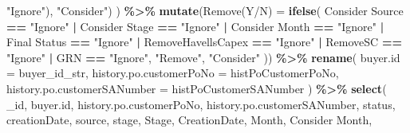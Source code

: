 \documentclass[
]{article}
\newenvironment{Shaded}{\begin{snugshade}}{\end{snugshade}}
\newcommand{\AttributeTok}[1]{\textcolor[rgb]{0.13,0.29,0.53}{#1}}
\newcommand{\FunctionTok}[1]{\textcolor[rgb]{0.13,0.29,0.53}{\textbf{#1}}}
\newcommand{\NormalTok}[1]{#1}
\newcommand{\OtherTok}[1]{\textcolor[rgb]{0.56,0.35,0.01}{#1}}
\newcommand{\SpecialCharTok}[1]{\textcolor[rgb]{0.81,0.36,0.00}{\textbf{#1}}}
\newcommand{\StringTok}[1]{\textcolor[rgb]{0.31,0.60,0.02}{#1}}
\begin{document}
\begin{Shaded}
\begin{Highlighting}[]
                                             \StringTok{"Ignore"}\NormalTok{),}
                                      \StringTok{"Consider"}\NormalTok{)}
\NormalTok{        ) }\SpecialCharTok{\%\textgreater{}\%}
          \FunctionTok{mutate}\NormalTok{(}\StringTok{\textasciigrave{}}\AttributeTok{Remove(Y/N)}\StringTok{\textasciigrave{}} \OtherTok{=} \FunctionTok{ifelse}\NormalTok{(}
            \StringTok{\textasciigrave{}}\AttributeTok{Consider Source}\StringTok{\textasciigrave{}} \SpecialCharTok{==} \StringTok{"Ignore"} \SpecialCharTok{|} \StringTok{\textasciigrave{}}\AttributeTok{Consider Stage}\StringTok{\textasciigrave{}} \SpecialCharTok{==} \StringTok{"Ignore"} \SpecialCharTok{|}
              \StringTok{\textasciigrave{}}\AttributeTok{Consider Month}\StringTok{\textasciigrave{}} \SpecialCharTok{==} \StringTok{"Ignore"} \SpecialCharTok{|} \StringTok{\textasciigrave{}}\AttributeTok{Final Status}\StringTok{\textasciigrave{}} \SpecialCharTok{==} \StringTok{"Ignore"} \SpecialCharTok{|}
\NormalTok{              RemoveHavellsCapex }\SpecialCharTok{==} \StringTok{"Ignore"} \SpecialCharTok{|}\NormalTok{ RemoveSC }\SpecialCharTok{==} \StringTok{"Ignore"} \SpecialCharTok{|}\NormalTok{ GRN }\SpecialCharTok{==} \StringTok{"Ignore"}\NormalTok{,}
            \StringTok{"Remove"}\NormalTok{, }\StringTok{"Consider"}
\NormalTok{          )) }\SpecialCharTok{\%\textgreater{}\%}
          \FunctionTok{rename}\NormalTok{(}
            \StringTok{\textasciigrave{}}\AttributeTok{buyer.id}\StringTok{\textasciigrave{}}                    \OtherTok{=}\NormalTok{ buyer\_id\_str,}
            \StringTok{\textasciigrave{}}\AttributeTok{history.po.customerPoNo}\StringTok{\textasciigrave{}}     \OtherTok{=}\NormalTok{ histPoCustomerPoNo,}
            \StringTok{\textasciigrave{}}\AttributeTok{history.po.customerSANumber}\StringTok{\textasciigrave{}} \OtherTok{=}\NormalTok{ histPoCustomerSANumber}
\NormalTok{          ) }\SpecialCharTok{\%\textgreater{}\%}
          \FunctionTok{select}\NormalTok{(}
            \StringTok{\textasciigrave{}}\AttributeTok{\_id}\StringTok{\textasciigrave{}}\NormalTok{, }\StringTok{\textasciigrave{}}\AttributeTok{buyer.id}\StringTok{\textasciigrave{}}\NormalTok{, }\StringTok{\textasciigrave{}}\AttributeTok{history.po.customerPoNo}\StringTok{\textasciigrave{}}\NormalTok{, }\StringTok{\textasciigrave{}}\AttributeTok{history.po.customerSANumber}\StringTok{\textasciigrave{}}\NormalTok{,}
\NormalTok{            status, creationDate, source, stage, Stage, CreationDate, Month, }\StringTok{\textasciigrave{}}\AttributeTok{Consider Month}\StringTok{\textasciigrave{}}\NormalTok{,}

\end{Highlighting}
\end{Shaded}
\end{document}
